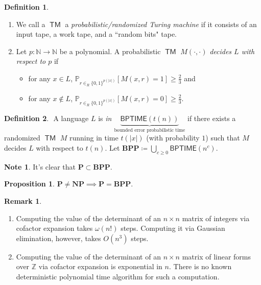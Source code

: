\documentclass[10pt,letterpaper,cm]{nupset}
\theoremstyle{definition}
\newtheorem*{definition}{Definition}
\newtheorem{note}{Note}
\newtheorem{remark}{Remark}
\newtheorem{prop}{Proposition}
\newcommand{\N}{\mathbb N}
\newcommand{\Z}{\mathbb Z}
\newcommand{\1}{\mathbf{1}}
\newcommand{\0}{\vec 0}
\DeclareMathOperator{\TM}{\mathsf{TM}}
\begin{document}
\begin{definition} $ $
\begin{enumerate}
\item We call a $\TM$ a \textit{probabilistic/randomized Turing machine} if it consists of an input tape, a work tape, and a ``random bits" tape.  
\item Let $p: \N \to \N$ be a polynomial. A probabilistic $\TM$ $M({\cdot}, {\cdot})$ \textit{decides $L$ with respect to $p$} if 
\begin{itemize}
\item for any $x\in L$, $\mathbb{P}_{r\in_R \{0,1\}^{p(\lvert{x}\rvert)}}[M(x,r)=1] \geq \frac{2}{3}$ and
\item for any $x\notin L$, $\mathbb{P}_{r\in_R \{0,1\}^{p(\lvert{x}\rvert)}}[M(x,r)=0] \geq \frac{2}{3}$.
\end{itemize}
\end{enumerate}
\end{definition}

\begin{definition} $ $
A language $L$ is \textit{in $\underbrace{\mathsf{BPTIME}(t(n))}_{\text{bounded error probabilistic time}}$} if there exists a randomized $\TM$ $M$ running in time $t(|x|)$ (with probability $1$) such that $M$ decides $L$ with respect to $t(n)$. Let $\mathbf{BPP} \coloneqq \bigcup_{c\geq 0} \mathsf{BPTIME}(n^c)$.
\end{definition}

\begin{note}
It's clear that $\mathbf{P} \subset \mathbf{BPP}$.
\end{note}

\begin{prop}
$\mathbf{P} \ne \mathbf{NP} \implies \mathbf{P} = \mathbf{BPP}$.
\end{prop}

\begin{remark} $ $
\begin{enumerate}
\item Computing the value of the determinant of an $n\times n$ matrix of integers via cofactor expansion takes $\omega(n!)$ steps. Computing it via Gaussian elimination, however, takes $O(n^3)$ steps. 
\item Computing the value of the determinant of an $n\times n$ matrix of linear forms over $\Z$ via cofactor expansion is exponential in $n$. There is no known deterministic polynomial time algorithm for such a computation.
\end{enumerate}
\end{remark}
\end{document}

